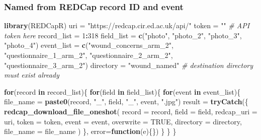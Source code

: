 \documentclass[]{book}
\newenvironment{Shaded}{\begin{snugshade}}{\end{snugshade}}
\newcommand{\CommentTok}[1]{\textcolor[rgb]{0.56,0.35,0.01}{\textit{#1}}}
\newcommand{\ControlFlowTok}[1]{\textcolor[rgb]{0.13,0.29,0.53}{\textbf{#1}}}
\newcommand{\DataTypeTok}[1]{\textcolor[rgb]{0.13,0.29,0.53}{#1}}
\newcommand{\DecValTok}[1]{\textcolor[rgb]{0.00,0.00,0.81}{#1}}
\newcommand{\KeywordTok}[1]{\textcolor[rgb]{0.13,0.29,0.53}{\textbf{#1}}}
\newcommand{\NormalTok}[1]{#1}
\newcommand{\OperatorTok}[1]{\textcolor[rgb]{0.81,0.36,0.00}{\textbf{#1}}}
\newcommand{\OtherTok}[1]{\textcolor[rgb]{0.56,0.35,0.01}{#1}}
\newcommand{\StringTok}[1]{\textcolor[rgb]{0.31,0.60,0.02}{#1}}
\begin{document}
\hypertarget{named-from-redcap-record-id-and-event}{%
\subsubsection{Named from REDCap record ID and event}\label{named-from-redcap-record-id-and-event}}

\begin{Shaded}
\begin{Highlighting}[]
\KeywordTok{library}\NormalTok{(REDCapR)}
\NormalTok{uri =}\StringTok{ "https://redcap.cir.ed.ac.uk/api/"}
\NormalTok{token =}\StringTok{ ""} \CommentTok{# API token here}
\NormalTok{record_list =}\StringTok{ }\DecValTok{1}\OperatorTok{:}\DecValTok{318}
\NormalTok{field_list =}\StringTok{ }\KeywordTok{c}\NormalTok{(}\StringTok{"photo"}\NormalTok{, }\StringTok{"photo_2"}\NormalTok{, }\StringTok{"photo_3"}\NormalTok{, }\StringTok{"photo_4"}\NormalTok{)}
\NormalTok{event_list =}\StringTok{ }\KeywordTok{c}\NormalTok{(}\StringTok{"wound_concerns_arm_2"}\NormalTok{, }\StringTok{"questionnaire_1_arm_2"}\NormalTok{,}
               \StringTok{"questionnaire_2_arm_2"}\NormalTok{, }\StringTok{"questionnaire_3_arm_2"}\NormalTok{)}
\NormalTok{directory =}\StringTok{ "wound_named"} \CommentTok{# destination directory must exist already}

\ControlFlowTok{for}\NormalTok{(record }\ControlFlowTok{in}\NormalTok{ record_list)\{}
  \ControlFlowTok{for}\NormalTok{(field }\ControlFlowTok{in}\NormalTok{ field_list)\{}
    \ControlFlowTok{for}\NormalTok{(event }\ControlFlowTok{in}\NormalTok{ event_list)\{}
\NormalTok{      file_name =}\StringTok{ }\KeywordTok{paste0}\NormalTok{(record, }\StringTok{"_"}\NormalTok{, field, }\StringTok{"_"}\NormalTok{, event, }\StringTok{".jpg"}\NormalTok{)}
\NormalTok{      result =}\StringTok{ }
\StringTok{        }\KeywordTok{tryCatch}\NormalTok{(\{}
          \KeywordTok{redcap_download_file_oneshot}\NormalTok{(}
            \DataTypeTok{record        =}\NormalTok{ record,}
            \DataTypeTok{field         =}\NormalTok{ field,}
            \DataTypeTok{redcap_uri    =}\NormalTok{ uri,}
            \DataTypeTok{token         =}\NormalTok{ token,}
            \DataTypeTok{event         =}\NormalTok{ event,}
            \DataTypeTok{overwrite     =} \OtherTok{TRUE}\NormalTok{,}
            \DataTypeTok{directory     =}\NormalTok{ directory,}
            \DataTypeTok{file_name     =}\NormalTok{ file_name}
\NormalTok{          )}
\NormalTok{        \}, }\DataTypeTok{error=}\ControlFlowTok{function}\NormalTok{(e)\{\})}
\NormalTok{    \}}
\NormalTok{  \}}
\NormalTok{\}}
\end{Highlighting}
\end{Shaded}
\end{document}
